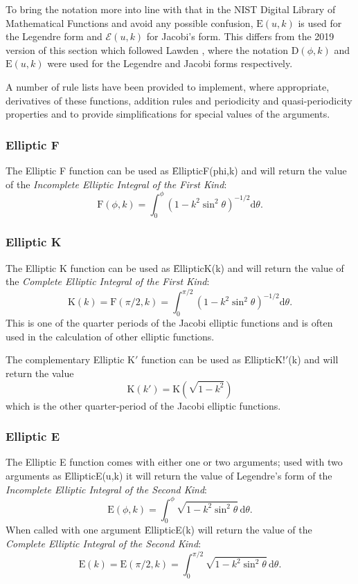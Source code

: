 To bring the notation more into line with that in the NIST Digital Library of
Mathematical Functions and avoid any possible confusion, $\mathrm{E}(u, k)$ is used for
the Legendre form and $\mathcal{E}(u, k)$ for Jacobi's form.
This differs from the 2019 version of this section which followed Lawden \cite{Lawden:89},
where the notation $\mathrm{D}(\phi, k)$  and $\mathrm{E}(u, k)$ were used for the
Legendre and Jacobi forms respectively.

A number of rule lists have been provided to implement, where appropriate,
derivatives of these functions, addition rules and periodicity and
quasi-periodicity properties and to provide simplifications for special values
of the arguments.

\subsubsection{Elliptic F}
\hypertarget{operator:ELLIPTICF}{}

The Elliptic F function can be used as \f{EllipticF(phi,k)} and
will return the value of the \emph{Incomplete Elliptic Integral of the
First Kind}:
\[\mathrm{F}(\phi, k)=\int_0^\phi(1-k^2 \sin^2 \theta)^{-1/2} \mathrm{d}\theta.\]

\subsubsection{Elliptic K}
\hypertarget{operator:ELLIPTICK}{}

The Elliptic K function can be used as \f{EllipticK(k)} and will
return the value of the \emph{Complete Elliptic Integral of the
First Kind}:
\[\mathrm{K}(k)=\mathrm{F}(\pi/2, k) =\int_0^{\pi/2}(1-k^2 \sin^2 \theta)^{-1/2}\mathrm{d}\theta.\]
This is one of the quarter periods of the Jacobi elliptic
functions and is often used in the calculation of other elliptic functions.

The complementary Elliptic K$'$ function can be used as \f{EllipticK!$'$(k)}
and will return the value
\[\mathrm{K}(k')=\mathrm{K}(\sqrt{1-k^2})\]
which is the other quarter-period of the Jacobi elliptic functions.

\subsubsection{Elliptic E}
\hypertarget{operator:ELLIPTICE}{}

The Elliptic E function comes with either one or two arguments;
used with two arguments as \f{EllipticE(u,k)}
it will return the value of Legendre's form of
the \emph{Incomplete Elliptic Integral of the Second Kind}:
\[\mathrm{E}(\phi, k)=\int_0^\phi \sqrt{1-k^2 \sin^2 \theta} \,\mathrm{d}\theta.\]
 When called with one argument \f{EllipticE(k)} will return the value of the
\emph{Complete Elliptic Integral of the Second Kind}:
\[\mathrm{E}(k)=\mathrm{E}(\pi/2, k) =
\int_0^{\pi/2} \sqrt{1-k^2 \sin^2 \theta} \,\mathrm{d}\theta.\]

